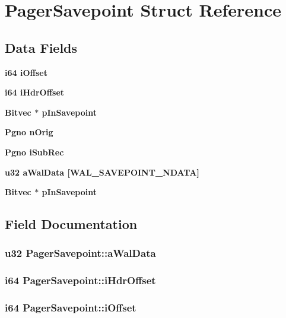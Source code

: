 \section{Pager\-Savepoint Struct Reference}
\label{structPagerSavepoint}
\subsection*{Data Fields}
\begin{CompactItemize}
\item 
\bf{i64} \bf{i\-Offset}
\item 
\bf{i64} \bf{i\-Hdr\-Offset}
\item 
\bf{Bitvec} $\ast$ \bf{p\-In\-Savepoint}
\item 
\bf{Pgno} \bf{n\-Orig}
\item 
\bf{Pgno} \bf{i\-Sub\-Rec}
\item 
\bf{u32} \bf{a\-Wal\-Data} [WAL\_\-SAVEPOINT\_\-NDATA]
\item 
\bf{Bitvec} $\ast$ \bf{p\-In\-Savepoint}
\end{CompactItemize}


\subsection{Field Documentation}
\subsubsection{\setlength{\rightskip}{0pt plus 5cm}\bf{u32} \bf{Pager\-Savepoint::a\-Wal\-Data}}\label{structPagerSavepoint_fd300ddbb9f6867aaaa3ad2c6fb6b165}


\subsubsection{\setlength{\rightskip}{0pt plus 5cm}\bf{i64} \bf{Pager\-Savepoint::i\-Hdr\-Offset}}\label{structPagerSavepoint_0745fd866811bd71636e3033a944def7}


\subsubsection{\setlength{\rightskip}{0pt plus 5cm}\bf{i64} \bf{Pager\-Savepoint::i\-Offset}}\label{structPagerSavepoint_92ba733d583e5b62a9a59f1d2ae320bd}


